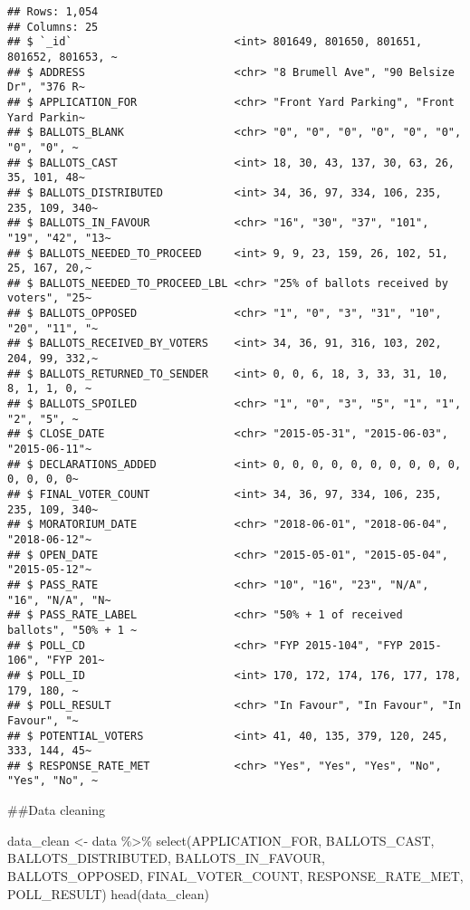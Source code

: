\documentclass[
]{article}
\newenvironment{Shaded}{\begin{snugshade}}{\end{snugshade}}
\newcommand{\FunctionTok}[1]{\textcolor[rgb]{0.00,0.00,0.00}{#1}}
\newcommand{\NormalTok}[1]{#1}
\newcommand{\OtherTok}[1]{\textcolor[rgb]{0.56,0.35,0.01}{#1}}
\newcommand{\SpecialCharTok}[1]{\textcolor[rgb]{0.00,0.00,0.00}{#1}}
\begin{document}
\begin{verbatim}
## Rows: 1,054
## Columns: 25
## $ `_id`                         <int> 801649, 801650, 801651, 801652, 801653, ~
## $ ADDRESS                       <chr> "8 Brumell Ave", "90 Belsize Dr", "376 R~
## $ APPLICATION_FOR               <chr> "Front Yard Parking", "Front Yard Parkin~
## $ BALLOTS_BLANK                 <chr> "0", "0", "0", "0", "0", "0", "0", "0", ~
## $ BALLOTS_CAST                  <int> 18, 30, 43, 137, 30, 63, 26, 35, 101, 48~
## $ BALLOTS_DISTRIBUTED           <int> 34, 36, 97, 334, 106, 235, 235, 109, 340~
## $ BALLOTS_IN_FAVOUR             <chr> "16", "30", "37", "101", "19", "42", "13~
## $ BALLOTS_NEEDED_TO_PROCEED     <int> 9, 9, 23, 159, 26, 102, 51, 25, 167, 20,~
## $ BALLOTS_NEEDED_TO_PROCEED_LBL <chr> "25% of ballots received by voters", "25~
## $ BALLOTS_OPPOSED               <chr> "1", "0", "3", "31", "10", "20", "11", "~
## $ BALLOTS_RECEIVED_BY_VOTERS    <int> 34, 36, 91, 316, 103, 202, 204, 99, 332,~
## $ BALLOTS_RETURNED_TO_SENDER    <int> 0, 0, 6, 18, 3, 33, 31, 10, 8, 1, 1, 0, ~
## $ BALLOTS_SPOILED               <chr> "1", "0", "3", "5", "1", "1", "2", "5", ~
## $ CLOSE_DATE                    <chr> "2015-05-31", "2015-06-03", "2015-06-11"~
## $ DECLARATIONS_ADDED            <int> 0, 0, 0, 0, 0, 0, 0, 0, 0, 0, 0, 0, 0, 0~
## $ FINAL_VOTER_COUNT             <int> 34, 36, 97, 334, 106, 235, 235, 109, 340~
## $ MORATORIUM_DATE               <chr> "2018-06-01", "2018-06-04", "2018-06-12"~
## $ OPEN_DATE                     <chr> "2015-05-01", "2015-05-04", "2015-05-12"~
## $ PASS_RATE                     <chr> "10", "16", "23", "N/A", "16", "N/A", "N~
## $ PASS_RATE_LABEL               <chr> "50% + 1 of received ballots", "50% + 1 ~
## $ POLL_CD                       <chr> "FYP 2015-104", "FYP 2015-106", "FYP 201~
## $ POLL_ID                       <int> 170, 172, 174, 176, 177, 178, 179, 180, ~
## $ POLL_RESULT                   <chr> "In Favour", "In Favour", "In Favour", "~
## $ POTENTIAL_VOTERS              <int> 41, 40, 135, 379, 120, 245, 333, 144, 45~
## $ RESPONSE_RATE_MET             <chr> "Yes", "Yes", "Yes", "No", "Yes", "No", ~
\end{verbatim}

\#\#Data cleaning

\begin{Shaded}
\begin{Highlighting}[]
\NormalTok{data\_clean }\OtherTok{\textless{}{-}}\NormalTok{ data }\SpecialCharTok{\%\textgreater{}\%}
  \FunctionTok{select}\NormalTok{(APPLICATION\_FOR, BALLOTS\_CAST, BALLOTS\_DISTRIBUTED, BALLOTS\_IN\_FAVOUR, BALLOTS\_OPPOSED, FINAL\_VOTER\_COUNT, RESPONSE\_RATE\_MET, POLL\_RESULT)}
\FunctionTok{head}\NormalTok{(data\_clean)}
\end{Highlighting}
\end{Shaded}
\end{document}
